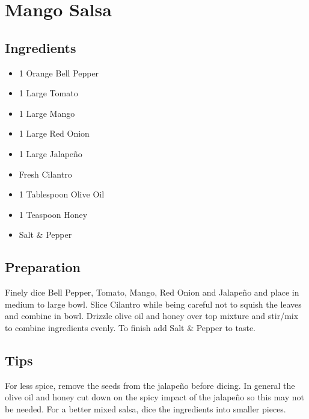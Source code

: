 \thispagestyle{fancy}
\section{Mango Salsa} \label{MangoSalsa}
\AddToShipoutPicture*{\MangoSalsa}

\subsection*{Ingredients}
\begin{multicols}{3}
	\begin{itemize}
		\item 1 Orange Bell Pepper
		\item 1 Large Tomato
		\item 1 Large Mango
		\item 1 Large Red Onion
		\item 1 Large Jalape\~{n}o
		\item Fresh Cilantro
		\item 1 Tablespoon Olive Oil
		\item 1 Teaspoon Honey
		\item Salt \& Pepper  
	\end{itemize}
\end{multicols}

\subsection*{Preparation}
Finely dice Bell Pepper, Tomato, Mango, Red Onion and Jalape\~{n}o and place in medium to large bowl. Slice Cilantro while being careful not to squish the leaves and combine in bowl. Drizzle olive oil and honey over top mixture and stir/mix to combine ingredients evenly. To finish add Salt \& Pepper to taste.

\subsection*{Tips}

For less spice, remove the seeds from the jalape\~{n}o before dicing. In general the olive oil and honey cut down on the spicy impact of the jalape\~{n}o so this may not be needed. For a better mixed salsa, dice the ingredients into smaller pieces. 